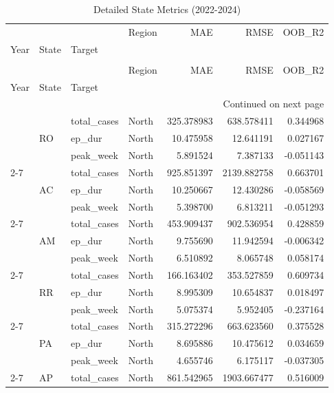 \documentclass{report}
\begin{document}
\begin{center}
\begin{center}
\begingroup
\tiny
\begin{longtable}{llllrrr}
\caption{Detailed State Metrics (2022-2024)} \\
\toprule
 &  &  & Region & MAE & RMSE & OOB\_R2 \\
Year & State & Target &  &  &  &  \\
\midrule
\endfirsthead
\caption[]{Detailed State Metrics (2022-2024)} \\
\toprule
 &  &  & Region & MAE & RMSE & OOB\_R2 \\
Year & State & Target &  &  &  &  \\
\midrule
\endhead
\midrule
\multicolumn{7}{r}{Continued on next page} \\
\midrule
\endfoot
\bottomrule
\endlastfoot
\multirow[t]{81}{*}{2022} & \multirow[t]{3}{*}{RO} & total\_cases & North & 325.378983 & 638.578411 & 0.344968 \\
 &  & ep\_dur & North & 10.475958 & 12.641191 & 0.027167 \\
 &  & peak\_week & North & 5.891524 & 7.387133 & -0.051143 \\
\cline{2-7}
 & \multirow[t]{3}{*}{AC} & total\_cases & North & 925.851397 & 2139.882758 & 0.663701 \\
 &  & ep\_dur & North & 10.250667 & 12.430286 & -0.058569 \\
 &  & peak\_week & North & 5.398700 & 6.813211 & -0.051293 \\
\cline{2-7}
 & \multirow[t]{3}{*}{AM} & total\_cases & North & 453.909437 & 902.536954 & 0.428859 \\
 &  & ep\_dur & North & 9.755690 & 11.942594 & -0.006342 \\
 &  & peak\_week & North & 6.510892 & 8.065748 & 0.058174 \\
\cline{2-7}
 & \multirow[t]{3}{*}{RR} & total\_cases & North & 166.163402 & 353.527859 & 0.609734 \\
 &  & ep\_dur & North & 8.995309 & 10.654837 & 0.018497 \\
 &  & peak\_week & North & 5.075374 & 5.952405 & -0.237164 \\
\cline{2-7}
 & \multirow[t]{3}{*}{PA} & total\_cases & North & 315.272296 & 663.623560 & 0.375528 \\
 &  & ep\_dur & North & 8.695886 & 10.475612 & 0.034659 \\
 &  & peak\_week & North & 4.655746 & 6.175117 & -0.037305 \\
\cline{2-7}
 & \multirow[t]{3}{*}{AP} & total\_cases & North & 861.542965 & 1903.667477 & 0.516009 \\

\end{longtable}
\end{center}
\end{center}
\end{document}
